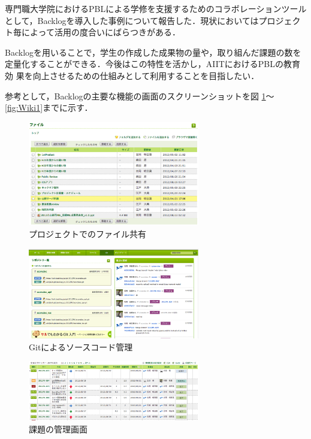 \documentclass[submit,techreq,noauthor]{ipsj}
\begin{document}
専門職大学院におけるPBLによる学修を支援するためのコラボレーションツール
として，Backlogを導入した事例について報告した．現状においてはプロジェク
ト毎によって活用の度合いにばらつきがある．

Backlogを用いることで，学生の作成した成果物の量や，取り組んだ課題の数を
定量化することができる．今後はこの特性を活かし，AIITにおけるPBLの教育効
果を向上させるための仕組みとして利用することを目指したい．




\appendix

参考として，Backlogの主要な機能の画面のスクリーンショットを図
\ref{fig:File}〜\ref{fig:Wiki1}までに示す．

\begin{figure}[t]
\includegraphics[width=7.5cm]{./figure/File.eps}
\caption{プロジェクトでのファイル共有}
\label{fig:File}
\end{figure}

\begin{figure}[t]
\includegraphics[width=7.5cm]{./figure/Git.eps}
\caption{Gitによるソースコード管理}
\label{fig:Git}
\end{figure}

\begin{figure}[t]
\includegraphics[width=7.5cm]{./figure/Issue.eps}
\caption{課題の管理画面}
\label{fig:Issue}
\end{figure}
\end{document}
